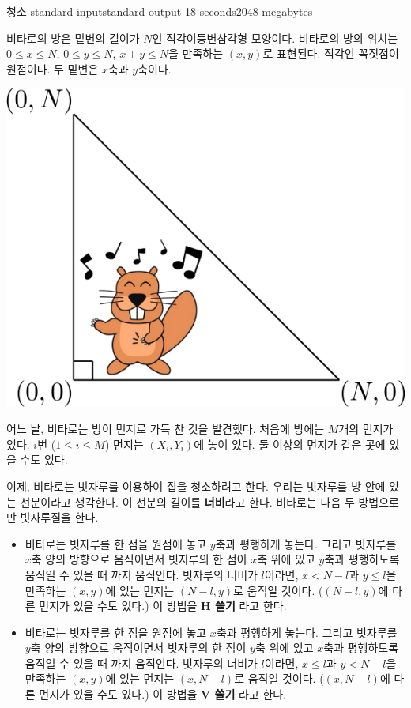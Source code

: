 \begin{problem}{청소}
	{standard input}{standard output}
	{18 seconds}{2048 megabytes}{}
	
	비타로의 방은 밑변의 길이가 $N$인 직각이등변삼각형 모양이다. 비타로의 방의 위치는 $0 \le x \le N$, $0 \le y \le N$, $x+y \le N$을 만족하는 $(x, y)$로 표현된다. 직각인 꼭짓점이 원점이다. 두 밑변은 $x$축과 $y$축이다.
	
	\begin{center}
		\includegraphics[width=0.5\linewidth]{img1.png}
	\end{center}
	
	
	
	어느 날, 비타로는 방이 먼지로 가득 찬 것을 발견했다. 처음에 방에는 $M$개의 먼지가 있다. $i$번 ($1 \le i \le M$) 먼지는 $(X_i, Y_i)$에 놓여 있다. 둘 이상의 먼지가 같은 곳에 있을 수도 있다.
	
	이제, 비타로는 빗자루를 이용하여 집을 청소하려고 한다. 우리는 빗자루를 방 안에 있는 선분이라고 생각한다. 이 선분의 길이를 \textbf{너비}라고 한다. 비타로는 다음 두 방법으로만 빗자루질을 한다.
	
	
	\begin{itemize}
		\item 비타로는 빗자루를 한 점을 원점에 놓고 $y$축과 평행하게 놓는다. 그리고 빗자루를 $x$축 양의 방향으로 움직이면서 빗자루의 한 점이 $x$축 위에 있고 $y$축과 평행하도록 움직일 수 있을 때 까지 움직인다. 빗자루의 너비가 $l$이라면, $x<N-l$과 $y \le l$을 만족하는 $(x, y)$에 있는 먼지는 $(N-l, y)$로 움직일 것이다. ($(N-l, y)$에 다른 먼지가 있을 수도 있다.) 이 방법을 \textbf{H 쓸기} 라고 한다.
		
		\item 비타로는 빗자루를 한 점을 원점에 놓고 $x$축과 평행하게 놓는다. 그리고 빗자루를 $y$축 양의 방향으로 움직이면서 빗자루의 한 점이 $y$축 위에 있고 $x$축과 평행하도록 움직일 수 있을 때 까지 움직인다. 빗자루의 너비가 $l$이라면, $x\le l$과 $y < N-l$을 만족하는 $(x, y)$에 있는 먼지는 $(x, N-l)$로 움직일 것이다. ($(x, N-l)$에 다른 먼지가 있을 수도 있다.) 이 방법을 \textbf{V 쓸기} 라고 한다.
	\end{itemize}
	

\end{problem}
